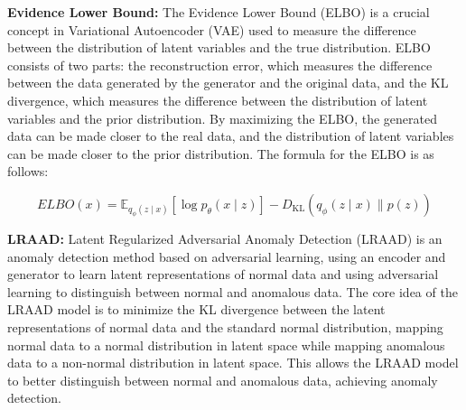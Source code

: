 \documentclass{article}
\begin{document}
\textbf{Evidence Lower Bound:} The Evidence Lower Bound (ELBO) is a crucial concept in Variational Autoencoder (VAE) used to measure the difference between the distribution of latent variables and the true distribution. ELBO consists of two parts: the reconstruction error, which measures the difference between the data generated by the generator and the original data, and the KL divergence, which measures the difference between the distribution of latent variables and the prior distribution. By maximizing the ELBO, the generated data can be made closer to the real data, and the distribution of latent variables can be made closer to the prior distribution. The formula for the ELBO is as follows:

\begin{equation}
  ELBO(x)=\mathbb{E}_{q_{\phi}(z \mid x)}[\log p_{\theta}(x \mid z)]-D_{\mathrm{KL}}\left(q_{\phi}(z \mid x) \| p(z)\right) 
\end{equation}

\textbf{LRAAD:} Latent Regularized Adversarial Anomaly Detection (LRAAD) is an anomaly detection method based on adversarial learning, using an encoder and generator to learn latent representations of normal data and using adversarial learning to distinguish between normal and anomalous data. The core idea of the LRAAD model is to minimize the KL divergence between the latent representations of normal data and the standard normal distribution, mapping normal data to a normal distribution in latent space while mapping anomalous data to a non-normal distribution in latent space. This allows the LRAAD model to better distinguish between normal and anomalous data, achieving anomaly detection.
\end{document}
